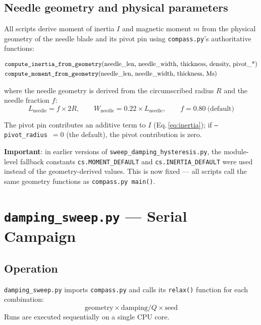 \documentclass[11pt,a4paper]{article}
\newcommand{\code}[1]{\texttt{#1}}
\newcommand{\file}[1]{\texttt{#1}}
\newcommand{\param}[1]{\texttt{--#1}}
\newcommand{\warn}[1]{\textcolor{warnorange}{\textbf{#1}}}
\begin{document}
\subsection{Needle geometry and physical parameters}

All scripts derive moment of inertia $I$ and magnetic moment $m$ from the
physical geometry of the needle blade and its pivot pin using
\texttt{compass.py}'s authoritative functions:

\begin{align}
  &\text{\code{compute\_inertia\_from\_geometry}(needle\_len, needle\_width, thickness,
    density, pivot\_*)} \label{eq:inertia}\\
  &\text{\code{compute\_moment\_from\_geometry}(needle\_len, needle\_width, thickness, Ms)}
    \label{eq:moment}
\end{align}

\noindent where the needle geometry is derived from the circumscribed radius $R$
and the needle fraction $f$:
\begin{equation}
  L_{\mathrm{needle}} = f \times 2R, \qquad
  W_{\mathrm{needle}} = 0.22 \times L_{\mathrm{needle}}, \qquad
  f = 0.80\ \text{(default)}
\end{equation}

\noindent The pivot pin contributes an additive term to $I$ (Eq.\,\ref{eq:inertia});
if \param{pivot\_radius}~$= 0$ (the default), the pivot contribution is zero.

\warn{Important}: in earlier versions of \file{sweep\_damping\_hysteresis.py},
the module-level fallback constants \code{cs.MOMENT\_DEFAULT} and
\code{cs.INERTIA\_DEFAULT} were used instead of the geometry-derived values.
This is now fixed --- all scripts call the same geometry functions as
\code{compass.py\,main()}.

\section{\texttt{damping\_sweep.py} --- Serial Campaign}
\label{sec:v01}

\subsection{Operation}

\file{damping\_sweep.py} imports \texttt{compass.py} and calls its
\code{relax()} function for each combination:
\[
  \text{geometry} \times \text{damping/}Q \times \text{seed}
\]
Runs are executed sequentially on a single CPU core.
\end{document}
